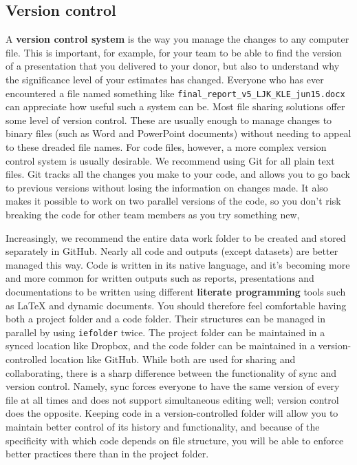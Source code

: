 \subsection{Version control}

A \textbf{version control system} is the way you manage the changes to any computer file.
This is important, for example, for your team to be able to find the version of a presentation that you delivered to your donor,
but also to understand why the significance level of your estimates has changed.
Everyone who has ever encountered a file named something like \texttt{final\_report\_v5\_LJK\_KLE\_jun15.docx}
can appreciate how useful such a system can be.
Most file sharing solutions offer some level of version control.
These are usually enough to manage changes to binary files (such as Word and PowerPoint documents) without needing to appeal to these dreaded file names.
For code files, however, a more complex version control system is usually desirable.
We recommend using Git for all plain text files.
Git tracks all the changes you make to your code,
and allows you to go back to previous versions without losing the information on changes made.
It also makes it possible to work on two parallel versions of the code,
so you don't risk breaking the code for other team members as you try something new,

Increasingly, we recommend the entire data work folder
to be created and stored separately in GitHub.
Nearly all code and outputs (except datasets) are better managed this way.
Code is written in its native language,
and it's becoming more and more common for written outputs such as reports,
presentations and documentations to be written using different \textbf{literate programming}
tools such as {\LaTeX} and dynamic documents.
You should therefore feel comfortable having both a project folder and a code folder.
Their structures can be managed in parallel by using \texttt{iefolder} twice.
The project folder can be maintained in a synced location like Dropbox,
and the code folder can be maintained in a version-controlled location like GitHub.
While both are used for sharing and collaborating,
there is a sharp difference between the functionality of sync and version control.
Namely, sync forces everyone to have the same version of every file at all times
and does not support simultaneous editing well; version control does the opposite.
Keeping code in a version-controlled folder will allow you
to maintain better control of its history and functionality,
and because of the specificity with which code depends on file structure,
you will be able to enforce better practices there than in the project folder.

